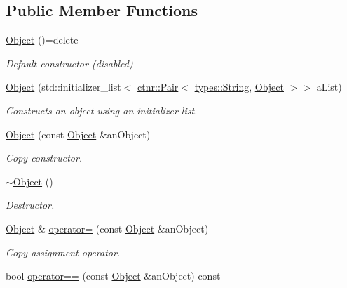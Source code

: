 \subsection*{Public Member Functions}
\begin{DoxyCompactItemize}
\item 
\hyperlink{classlibrary_1_1core_1_1ctnr_1_1_object_a51bb72dec3a1b2738e0ad92b977b8d8d}{Object} ()=delete
\begin{DoxyCompactList}\small\item\em Default constructor (disabled) \end{DoxyCompactList}\item 
\hyperlink{classlibrary_1_1core_1_1ctnr_1_1_object_a351131c4c1d6d7bd4f488ba99d7bf2d5}{Object} (std\+::initializer\+\_\+list$<$ \hyperlink{namespacelibrary_1_1core_1_1ctnr_aad6f8de4c0f279c10436d59d4ace74bd}{ctnr\+::\+Pair}$<$ \hyperlink{classlibrary_1_1core_1_1types_1_1_string}{types\+::\+String}, \hyperlink{classlibrary_1_1core_1_1ctnr_1_1_object}{Object} $>$$>$ a\+List)
\begin{DoxyCompactList}\small\item\em Constructs an object using an initializer list. \end{DoxyCompactList}\item 
\hyperlink{classlibrary_1_1core_1_1ctnr_1_1_object_a90f9c4579306498a5da413ac89ac0109}{Object} (const \hyperlink{classlibrary_1_1core_1_1ctnr_1_1_object}{Object} \&an\+Object)
\begin{DoxyCompactList}\small\item\em Copy constructor. \end{DoxyCompactList}\item 
\hyperlink{classlibrary_1_1core_1_1ctnr_1_1_object_a18a5350937267e55df0a76f5ce154a7a}{$\sim$\+Object} ()
\begin{DoxyCompactList}\small\item\em Destructor. \end{DoxyCompactList}\item 
\hyperlink{classlibrary_1_1core_1_1ctnr_1_1_object}{Object} \& \hyperlink{classlibrary_1_1core_1_1ctnr_1_1_object_a48f26f6297266090793fc53862654122}{operator=} (const \hyperlink{classlibrary_1_1core_1_1ctnr_1_1_object}{Object} \&an\+Object)
\begin{DoxyCompactList}\small\item\em Copy assignment operator. \end{DoxyCompactList}\item 
bool \hyperlink{classlibrary_1_1core_1_1ctnr_1_1_object_a543801cb9c7c22432603aca5435595e9}{operator==} (const \hyperlink{classlibrary_1_1core_1_1ctnr_1_1_object}{Object} \&an\+Object) const
$$
\end{DoxyCompactItemize}

